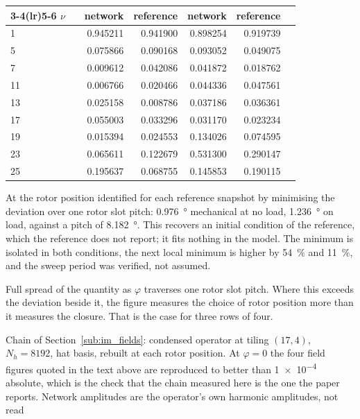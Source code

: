 \documentclass[10pt,a4paper,twocolumn]{article}
\theoremstyle{plain}
\theoremstyle{remark}
\begin{document}
\begin{table}[tp]
\begin{threeparttable}
\begin{tabular}{@{}llrrrrr@{}}
\cmidrule(lr){3-4}\cmidrule(lr){5-6}
$\nu$ & & network & reference & network & reference & \\
\midrule
1  & & \num{0.945211} & \num{0.941900} & \num{0.898254} & \num{0.919739} & \\
5  & & \num{0.075866} & \num{0.090168} & \num{0.093052} & \num{0.049075} & \\
7  & & \num{0.009612} & \num{0.042086} & \num{0.041872} & \num{0.018762} & \\
11 & & \num{0.006766} & \num{0.020466} & \num{0.044336} & \num{0.047561} & \\
13 & & \num{0.025158} & \num{0.008786} & \num{0.037186} & \num{0.036361} & \\
17 & & \num{0.055003} & \num{0.033296} & \num{0.031170} & \num{0.023234} & \\
19 & & \num{0.015394} & \num{0.024553} & \num{0.134026} & \num{0.074595} & \\
23 & & \num{0.065611} & \num{0.122679} & \num{0.531300} & \num{0.290147} & \\
25 & & \num{0.195637} & \num{0.068755} & \num{0.145853} & \num{0.190115} & \\
\bottomrule
\end{tabular}
\begin{tablenotes}[flushleft]\footnotesize
\item[a] At the rotor position identified for each reference snapshot by
minimising the deviation over one rotor slot pitch:
\SI{0.976}{\degree} mechanical at no load, \SI{1.236}{\degree} on load,
against a pitch of \SI{8.182}{\degree}. This recovers an initial
condition of the reference, which the reference does not report; it fits
nothing in the model. The minimum is isolated in both conditions, the
next local minimum is higher by \SI{54}{\percent} and
\SI{11}{\percent}, and the sweep period was verified, not assumed.
\item[b] Full spread of the quantity as $\varphi$ traverses one rotor
slot pitch. Where this exceeds the deviation beside it, the figure
measures the choice of rotor position more than it measures the closure.
That is the case for three rows of four.
\item Chain of Section~\ref{sub:im_fields}: condensed operator at tiling
$(17,4)$, $N_h=\num{8192}$, hat basis, rebuilt at each rotor position.
At $\varphi=0$ the four field figures quoted in
the text above are reproduced to better than \num{1e-4} absolute, which
is the check that the chain measured here is the one the paper reports.
Network amplitudes are the operator's own harmonic amplitudes, not read

\end{tablenotes}
\end{threeparttable}
\end{table}
\end{document}
